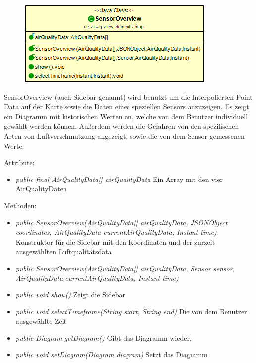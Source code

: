 \begin{minipage}{0.4\textwidth}
    \begin{figure}[H]
        \includegraphics[scale = 0.5]{media/frontend/view/de.view.elements.map/SensorOverview_Class.png}
    \end{figure}
    \end{minipage} \hfill
    \begin{minipage}{0.4\textwidth}
SensorOverview (auch Sidebar genannt) wird benutzt um die Interpolierten Point Data auf der Karte sowie die Daten eines speziellen Sensors anzuzeigen. Es zeigt ein Diagramm mit historischen Werten an, welche von dem Benutzer individuell gewählt werden können. Außerdem werden die Gefahren von den spezifischen Arten von Luftverschmutzung angezeigt, sowie die von dem Sensor gemessenen Werte.
\end{minipage}

Attribute:
\begin{itemize} 
    \item \emph{public final AirQualityData[] airQualityData} Ein Array mit den vier AirQualityDaten
\end{itemize}
Methoden:
\begin{itemize} 
    \item \emph{public SensorOverview(AirQualityData[] airQualityData, JSONObject coordinates, AirQualityData currentAirQualityData, Instant time)} Konstruktor für die Sidebar mit den Koordinaten und der zurzeit ausgewählten Luftqualitätsdata
    \item \emph{public SensorOverview(AirQualityData[] airQualityData, Sensor sensor, AirQualityData currentAirQualityData, Instant time)}
    \item \emph{public void show()} Zeigt die Sidebar
    \item \emph{public void selectTimeframe(String start, String end)} Die von dem Benutzer ausgewählte Zeit
    \item \emph{public Diagram getDiagram()} Gibt das Diagramm wieder.
    \item \emph{public void setDiagram(Diagram diagram)} Setzt das Diagramm
\end{itemize}